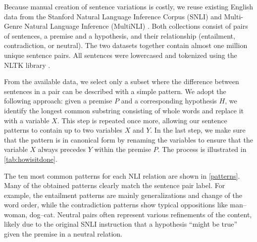 Because manual creation of sentence variations is costly, we reuse existing English data from the Stanford Natural Language Inference Corpus (SNLI) \citep{snli} and Multi-Genre Natural Language Inference (MultiNLI)  \citep{MultiNLI}. Both collections consist of pairs of sentences, a premise and a hypothesis, and their relationship (entailment, contradiction, or neutral). The two datasets together contain almost one million unique sentence pairs. All sentences were lowercased and tokenized using the NLTK library \citep{nltk}.

From the available data, we select only a subset where the difference between sentences in a pair can be described with a simple pattern. We adopt the following approach: given a premise  $P$ and a corresponding hypothesis  $H$, we identify the longest common substring consisting of whole words and replace it with a variable $X$. This step is repeated once more, allowing our sentence patterns to contain up to two variables $X$ and $Y$. In the last step, we make sure that the pattern is in canonical form by renaming the variables to ensure that the variable $X$ always precedes $Y$ within the premise  $P$. The process is illustrated in \cref{tab:howisitdone}.

The ten most common patterns for each NLI relation are shown in \cref{patterns}. Many of the obtained patterns clearly match the sentence pair label. For example, the entailment patterns are mainly generalizations and change of the word order, while the contradiction patterns show typical oppositions like man--woman, dog--cat. Neutral pairs often represent various refinements of the content, likely due to the original SNLI instruction that a hypothesis ``might be true'' given the premise in a neutral relation.

